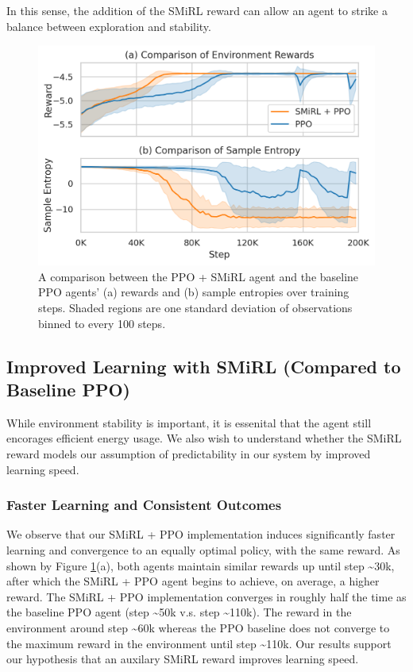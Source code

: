In this sense, the addition of the SMiRL reward can allow an agent to strike a balance between exploration and stability. 
\begin{figure}
    \centering
    \includegraphics[width=\linewidth]{graphics/combined_ent_rew.png}
    \caption{A comparison between the PPO + SMiRL agent and the baseline PPO agents' (a) rewards and (b) sample entropies over training steps. Shaded regions are one standard deviation of observations binned to every 100 steps.}
    \label{fig:sample_entropy}
\end{figure}

\subsection{Improved Learning with SMiRL (Compared to Baseline PPO)}
While environment stability is important, it is essenital that the agent still encorages efficient energy usage. We also wish to understand whether the SMiRL reward models our assumption of predictability in our system by improved learning speed.

\subsubsection{Faster Learning and Consistent Outcomes}\label{sec:RL_learning}
We observe that our SMiRL + PPO implementation induces significantly faster learning and convergence to an equally optimal policy, with the same reward. 
As shown by Figure \ref{fig:sample_entropy}(a), both agents maintain similar rewards up until step \textasciitilde 30k, after which the SMiRL + PPO agent begins to achieve, on average, a higher reward.
The SMiRL + PPO implementation converges in roughly half the time as the baseline PPO agent (step \textasciitilde 50k v.s. step \textasciitilde 110k). The reward in the environment around step \textasciitilde 60k whereas the PPO baseline does not 
converge to the maximum reward in the environment until step \textasciitilde 110k. 
Our results support our hypothesis that an auxilary SMiRL reward improves learning speed. 


